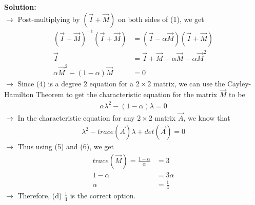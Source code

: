 \documentclass[journal]{IEEEtran}
\begin{document}
\textbf{Solution:}\\
$\rightarrow$ Post-multiplying by $(\vec{I}+\vec{M})$ on both sides of (1), we get
\begin{align}
    (\vec{I}+\vec{M})^{-1}(\vec{I}+\vec{M}) &= (\vec{I}-\alpha\vec{M})(\vec{I}+\vec{M}) \\
    \vec{I} &= \vec{I} + \vec{M} -\alpha\vec{M} - \alpha\vec{M}^2 \\
    \alpha\vec{M}^2 - (1-\alpha)\vec{M} &= 0
\end{align}
$\rightarrow$ Since (4) is a degree $2$ equation for a $2\times2$ matrix, we can use the Cayley-Hamilton Theorem to get the characteristic equation for the matrix $\vec{M}$ to be
\begin{align}
    \alpha\lambda^2 - (1-\alpha)\lambda = 0
\end{align}
$\rightarrow$ In the characteristic equation for any $2\times2$ matrix $\vec{A}$, we know that
\begin{align}
    \lambda^2 - trace(\vec{A})\lambda + det(\vec{A}) = 0
\end{align}
$\rightarrow$ Thus using (5) and (6), we get
\begin{align}
    trace(\vec{M}) = \frac{1-\alpha}{\alpha} &= 3 \\
    1 - \alpha &= 3\alpha \\
    \alpha &= \frac{1}{4}
\end{align}
$\rightarrow$ Therefore, (d) $\frac{1}{4}$ is the correct option.
\end{document}
